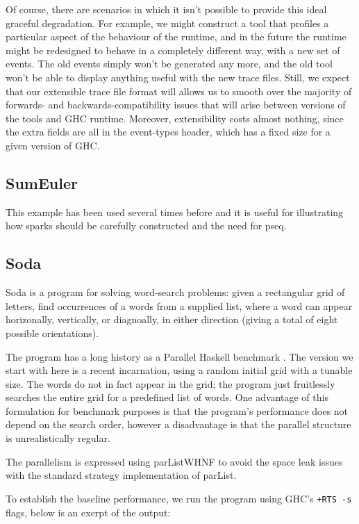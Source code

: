 \documentclass[twocolumn,9pt]{sigplanconf}
\newcommand{\codef}[1]{{\fontfamily{cmss}\small#1}}
\begin{document}
Of course, there are scenarios in which it isn't possible to provide
this ideal graceful degradation.  For example, we might construct a
tool that profiles a particular aspect of the behaviour of the
runtime, and in the future the runtime might be redesigned to behave
in a completely different way, with a new set of events.  The old
events simply won't be generated any more, and the old tool won't be
able to display anything useful with the new trace files.  Still, we
expect that our extensible trace file format will allows us to smooth
over the majority of forwards- and backwards-compatibility issues that
will arise between versions of the tools and GHC runtime.  Moreover,
extensibility costs almost nothing, since the extra fields are all in
the event-types header, which has a fixed size for a given version of
GHC.

\subsection{SumEuler}
This example has been used several times before and it is useful for illustrating how sparks should be carefully constructed and the need for pseq.

\subsection{Soda}

Soda is a program for solving word-search problems: given a
rectangular grid of letters, find occurrences of a words from a
supplied list, where a word can appear horizonally, vertically, or
diagnoally, in either direction (giving a total of eight possible
orientations).

The program has a long history as a Parallel Haskell benchmark
\cite{soda}.  The version we start with here is a recent incarnation,
using a random initial grid with a tunable size.  The words do not in
fact appear in the grid; the program just fruitlessly searches the
entire grid for a predefined list of words.  One advantage of this
formulation for benchmark purposes is that the program's performance
does not depend on the search order, however a disadvantage is that
the parallel structure is unrealistically regular.

The parallelism is expressed using \codef{parListWHNF} \cite{multicore-ghc}
to avoid the space leak issues with the standard strategy
implementation of \codef{parList}.

To establish the baseline performance, we run the program using GHC's
\texttt{+RTS -s} flags, below is an exerpt of the output:
\end{document}

